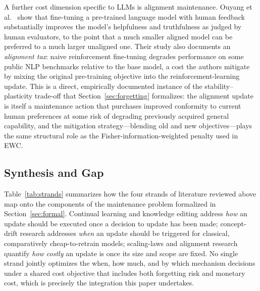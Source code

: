 \documentclass[electronics,article,submit,pdftex,moreauthors]{Definitions/mdpi}
\begin{document}
A further cost dimension specific to LLMs is alignment maintenance. Ouyang et al.~\cite{Ouyang2022} show that fine-tuning a pre-trained language model with human feedback substantially improves the model's helpfulness and truthfulness as judged by human evaluators, to the point that a much smaller aligned model can be preferred to a much larger unaligned one. Their study also documents an \textit{alignment tax}: naive reinforcement fine-tuning degrades performance on some public NLP benchmarks relative to the base model, a cost the authors mitigate by mixing the original pre-training objective into the reinforcement-learning update. This is a direct, empirically documented instance of the stability--plasticity trade-off that Section~\ref{sec:forgetting} formalizes: the alignment update is itself a maintenance action that purchases improved conformity to current human preferences at some risk of degrading previously acquired general capability, and the mitigation strategy---blending old and new objectives---plays the same structural role as the Fisher-information-weighted penalty used in EWC.

\subsection{Synthesis and Gap}

Table~\ref{tab:strands} summarizes how the four strands of literature reviewed above map onto the components of the maintenance problem formalized in Section~\ref{sec:formal}. Continual learning and knowledge editing address \textit{how} an update should be executed once a decision to update has been made; concept-drift research addresses \textit{when} an update should be triggered for classical, comparatively cheap-to-retrain models; scaling-laws and alignment research quantify \textit{how costly} an update is once its size and scope are fixed. No single strand jointly optimizes the when, how much, and by which mechanism decisions under a shared cost objective that includes both forgetting risk and monetary cost, which is precisely the integration this paper undertakes.
\end{document}
